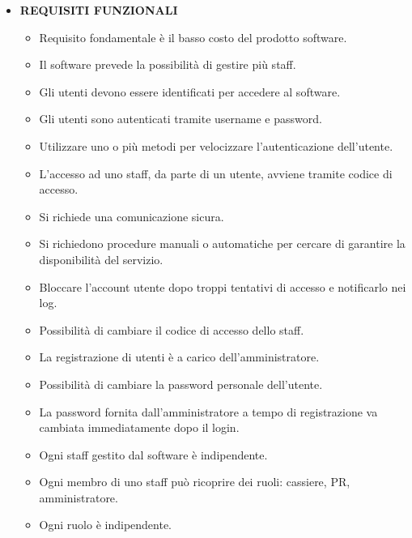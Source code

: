 \documentclass[a4paper]{article}
\begin{document}
\begin{itemize}
	
	\item \textbf{REQUISITI FUNZIONALI}
	
	\begin{itemize}
		\item Requisito fondamentale è il basso costo del prodotto software.
		\item Il software prevede la possibilità di gestire più staff.
		
		
		
		
		\item Gli utenti devono essere identificati per accedere al software.
		
		\item Gli utenti sono autenticati tramite username e password.
		\item Utilizzare uno o più metodi per velocizzare l'autenticazione dell'utente.
		\item L'accesso ad uno staff, da parte di un utente, avviene tramite codice di accesso.	
			
		\item Si richiede una comunicazione sicura.
		\item Si richiedono procedure manuali o automatiche per cercare di garantire la disponibilità del servizio.
		\item Bloccare l'account utente dopo troppi tentativi di accesso e notificarlo nei log.
		
		\item Possibilità di cambiare il codice di accesso dello staff.
		\item La registrazione di utenti è a carico dell'amministratore.
		\item Possibilità di cambiare la password personale dell'utente.
		\item La password fornita dall'amministratore a tempo di registrazione va cambiata immediatamente dopo il login.
		
		\item Ogni staff gestito dal software è indipendente.
		\item Ogni membro di uno staff può ricoprire dei ruoli: cassiere, PR, amministratore.
		\item Ogni ruolo è indipendente.
		

\end{itemize}
\end{itemize}
\end{document}

